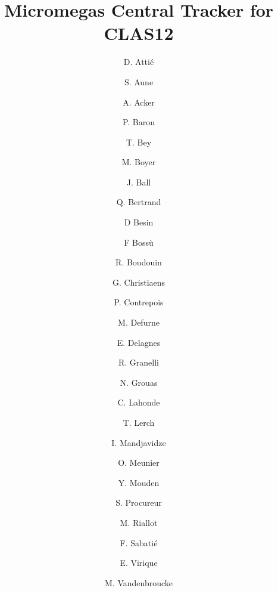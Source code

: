 \title{Micromegas Central Tracker for CLAS12}

\author[A]{D. Atti\'e}
\author[A]{S. Aune}
\author[A]{A. Acker} 
\author[A]{P. Baron}
\author[A]{T. Bey}
\author[A]{M. Boyer}
\author[A]{J. Ball}
\author[A]{Q. Bertrand}
\author[A]{D Besin}
\author[A]{F Boss\`u}
\author[A]{R. Boudouin}
\author[A]{G. Christiaens}
\author[A]{P. Contrepois}
\author[A]{M. Defurne}
\author[A]{E. Delagnes}
\author[A]{R. Granelli}
\author[A]{N. Grouas}
\author[A]{C. Lahonde}
\author[A]{T. Lerch}
\author[A]{I. Mandjavidze}
\author[A]{O. Meunier}
\author[A]{Y. Mouden}
\author[A]{S. Procureur}
\author[A]{M. Riallot}
\author[A]{F. Sabati\'e}
\author[A]{E. Virique}
\author[A]{M. Vandenbroucke}



\address[A]{CEA-Saclay, Gif-sur-Yvettes, France}
